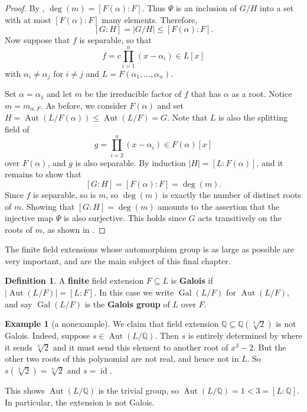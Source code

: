\documentclass[12pt]{report}
\numberwithin{equation}{section}
\numberwithin{theorem}{chapter}
\theoremstyle{definition}
\newtheorem{definition}[theorem]{Definition}
\newtheorem{example}[theorem]{Example}
\newtheorem*{basic properties}{Basic Properties}
\newtheorem*{Important Remark}{Important Remark}
\newcommand{\df}[1]{{\bf #1}\index{#1}}
\DeclareMathOperator{\Gal}{Gal}
\newcommand{\Q}{\mathbb{Q}}
\DeclareMathOperator{\id}{id}
\DeclareMathOperator{\Aut}{Aut}
\begin{document}
\begin{proof}
By , $\deg(m) = [F(\alpha): F]$. Thus $\Psi$ is an inclusion of $G/H$ into a set with at most $[F(\alpha): F]$ many elements. Therefore, 
$$[G:H] = |G/H| \leqslant [F(\alpha): F].$$
Now suppose that $f$ is separable, so that 
$$f = c \prod_{i=1}^n (x-\alpha_i) \in L[x]$$ 
with $\alpha_i \neq \alpha_j$ for $i \neq j$ and $L = F(\alpha_1, \dots, \alpha_n)$.

Set $\alpha = \alpha_1$ and let $m$ be the irreducible factor of $f$ that has $\alpha$ as a root. Notice $m=m_{\alpha,F}$. As before, we consider $F(\alpha)$ and set $H = \Aut(L/F(\alpha)) \leq \Aut(L/F) = G$. Note that $L$ is also the splitting field of 
$$g = \prod_{i=2}^n (x - \alpha_i) \in F(\alpha)[x]$$
over $F(\alpha)$, and $g$ is also separable. By induction $|H| = [L:F(\alpha)]$, and it remains to show that 
$$[G:H] = [F(\alpha):F] = \deg(m).$$ 
Since $f$ is separable, so is $m$, so $\deg(m)$ is exactly the number of distinct roots of $m$. Showing that $[G:H] =\deg(m)$ amounts to the assertion that the injective map $\Psi$ is also surjective. This holds since $G$ acts transitively on the roots of $m$, as shown in .
\end{proof}




The finite field extensions whose automorphism group is as large as possible are very important, and are the main subject of this final chapter.
 

\begin{definition}\index{$\Gal(L/F)$}
A {\bf finite} field extension $F \subseteq L$ is {\bf Galois} if $|\Aut(L/F) |= [L:F]$. In this case we write $\Gal(L/F)$ for $\Aut(L/F)$, and say $\Gal(L/F)$ is the \df{Galois group} of $L$ over $F$.
\end{definition}



\begin{example}[a nonexample]\label{non Galois example}
We claim that field extension $\Q \subseteq \Q(\sqrt[3]{2})$ is not Galois. Indeed, suppose $s \in \Aut(L/\Q)$. Then $s$ is entirely determined by where it sends $\sqrt[3]{2}$ and it must send this element to another root of $x^3 - 2$. But the other two roots of this polynomial are not real, and hence not in $L$. So $s(\sqrt[3]{2}) = \sqrt[3]{2}$ and $s = \id$.

This shows $\Aut(L/\Q)$ is the trivial group, so $\Aut(L/\Q) = 1 < 3 = [L:\Q]$. In particular, the extension is not Galois.
\end{example}
\end{document}
